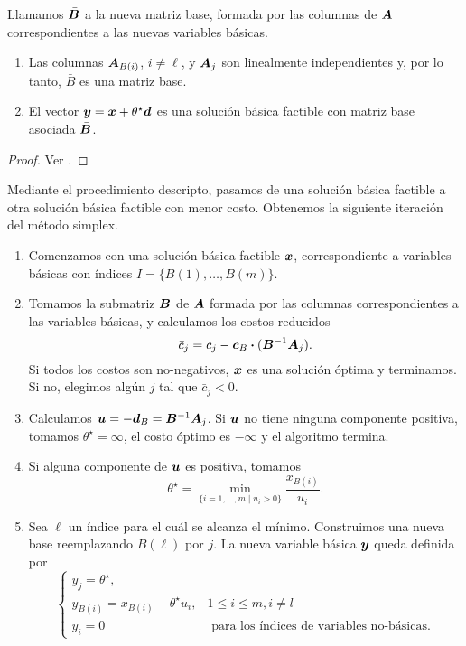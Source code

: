 Llamamos $\bar {\bm{B}}$ a la nueva matriz base, formada por las columnas de $\bm{A}$ correspondientes a las nuevas variables básicas.

\begin{theorem}\leavevmode
\begin{enumerate}
\item Las columnas $\bm{A}_{B(i)}$, $i \neq \ell$, y $\bm{A}_j$ son linealmente independientes y, por lo tanto, $\bar B$ es una matriz base.
\item El vector $\bm{y} = \bm{x} + \theta^\star \bm{d}$ es una solución básica factible con matriz base asociada $\bar {\bm{B}}$.
\end{enumerate}
\end{theorem}

\begin{proof}
Ver \cite[Teorema 3.2]{Bertsimas1997}.
\end{proof}

Mediante el procedimiento descripto, pasamos de una solución básica factible a otra solución básica factible con menor costo.
Obtenemos la siguiente iteración del método simplex.

\begin{enumerate}[label = (\arabic*)]
\item Comenzamos con una solución básica factible $\bm{x}$, correspondiente a variables básicas con índices $I = \{B(1), \dots, B(m)\}$.
\item Tomamos la submatriz $\bm{B}$ de $\bm{A}$ formada por las columnas correspondientes a las variables básicas, y calculamos los costos reducidos $$\bar c_j = c_j - \bm{c}_B \boldsymbol{\cdot} (\bm{B}^{-1} \bm{A}_j).$$
Si todos los costos son no-negativos, $\bm{x}$ es una solución óptima y terminamos. Si no, elegimos algún $j$ tal que $\bar c_j < 0$.
\item Calculamos $\bm{u} = -\bm{d}_B = \bm{B}^{-1} \bm{A}_j$. Si $\bm{u}$ no tiene ninguna componente positiva, tomamos $\theta^\star = \infty$, el costo óptimo es $-\infty$ y el algoritmo termina.
\item Si alguna componente de $\bm{u}$ es positiva, tomamos
$$
\theta^\star = \min_{\{i = 1, \dots, m \mid u_i > 0\}} \frac{x_{B(i)}}{u_i}.
$$
\item Sea $\ell$ un índice para el cuál se alcanza el mínimo. Construimos una nueva base reemplazando $B(\ell)$ por $j$. La nueva variable básica $\bm{y}$ queda definida por
    $$
    \begin{cases}
    y_j = \theta^\star, \\
    y_{B(i)} = x_{B(i)} - \theta^\star u_i, & 1 \le i \le m, i \neq l \\
    y_i = 0 & \text{ para los índices de variables no-básicas.}
    \end{cases}
    $$
\end{enumerate}

